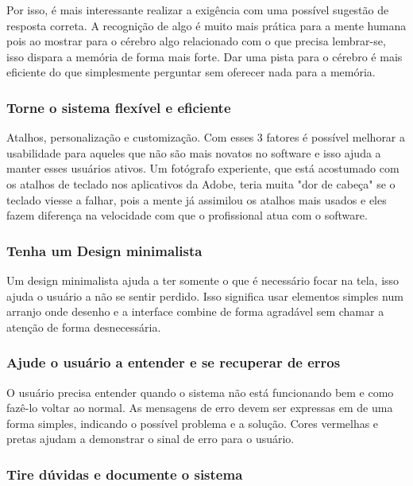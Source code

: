 Por isso, é mais interessante realizar a exigência com uma possível sugestão de resposta correta. A recognição de algo é muito mais prática para a mente humana pois ao mostrar para o cérebro algo relacionado com o que precisa lembrar-se, isso dispara a memória de forma mais forte. Dar uma pista para o cérebro é mais eficiente do que simplesmente perguntar sem oferecer nada para a memória. \cite{site:nielsenRecall}

\subsubsection{Torne o sistema flexível e eficiente}

Atalhos, personalização e customização. Com esses 3 fatores é possível melhorar a usabilidade para aqueles que não são mais novatos no software e isso ajuda a manter esses usuários ativos. Um fotógrafo experiente, que está acostumado com os atalhos de teclado nos aplicativos da Adobe, teria muita "dor de cabeça" se o teclado viesse a falhar, pois a mente já assimilou os atalhos mais usados e eles fazem diferença na velocidade com que o profissional atua com o software.
\cite{site:nielsenFlexibility}

\subsubsection{Tenha um Design minimalista}

Um design minimalista ajuda a ter somente o que é necessário focar na tela, isso ajuda o usuário a não se sentir perdido. Isso significa usar elementos simples num arranjo onde desenho e a interface combine de forma agradável sem chamar a atenção de forma desnecessária. \cite{site:nielsen}

\subsubsection{Ajude o usuário a entender e se recuperar de erros}

O usuário precisa entender quando o sistema não está funcionando bem e como fazê-lo voltar ao normal. As mensagens de erro devem ser expressas em de uma forma simples, indicando o possível problema e a solução. 
Cores vermelhas e pretas ajudam a demonstrar o sinal de erro para o usuário. \cite{site:nielsenError}

\subsubsection{Tire dúvidas e documente o sistema}


